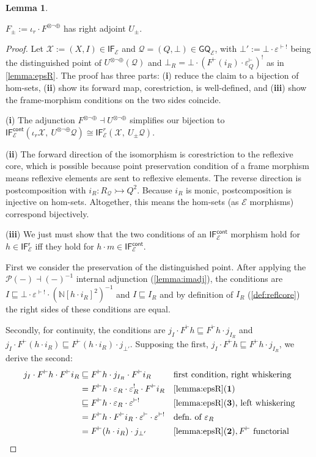 \documentclass{article}
\makeatletter
\newcommand{\allproofs}{} %
\newif\ifproofsinappendix
\newcommand{\lemmawithproof}[3]{%
  \begin{lemma}\label{#1}
    #2  
    \ifproofsinappendix \hyperref[xxx#1]{(Proof)} \fi
  \end{lemma}
    \ifproofsinappendix
  \g@addto@macro\allproofs{%
    \par\medskip
    \noindent
    \subsection*{\cref{#1}}\par
    #2\par
    \begin{proof}\label{xxx#1}
      #3
    \end{proof}%
  }
      \else

    \begin{proof}
      #3
    \end{proof}
    \fi 
}
\theoremstyle{definition}
\newtheorem{lemma}{Lemma}[section]
\newcommand{\N}{\mathbb{N}}
\newcommand{\cE}{\mathcal{E}}
\newcommand{\cP}{\mathcal{P}}
\newcommand{\cQ}{\mathcal{Q}}
\newcommand{\cX}{\mathcal{X}}
\newcommand{\cat}[1]{\mathsf{#1}}
\makeatother
\begin{document}
\lemmawithproof{lemma:reflrestrict}{
$F_\pm:=\iota_r\cdot F^{\otimes\neg\oplus}$ has right adjoint $U_\pm$.
}{
Let $\cX:=(X,I)\in \cat{IF_\cE}$ and $\cQ=(Q,\bot)\in \cat{GQ_\cE}$, with $\bot':=\bot\cdot \varepsilon^{\vdash!}$ being the distinguished point of $U^{\otimes\neg\oplus}(\cQ)$ and $\bot_R = \bot\cdot (F^\vdash(i_R)\cdot \varepsilon^\vdash_Q)^!$ as in \cref{lemma:epsR}. The proof has three parts: ({\bf i}) reduce the claim to a bijection of hom-sets, ({\bf ii}) show its forward map, corestriction, is well-defined, and ({\bf iii}) show the frame-morphism conditions on the two sides coincide.


({\bf i}) The adjunction $F^{\otimes\neg\oplus}\dashv U^{\otimes\neg\oplus}$ simplifies our bijection to $\cat{IF^{cont}_\cE}(\iota_r\cX,\ U^{\otimes\neg\oplus}\cQ)\cong\cat{IF}^r_\cE(\cX,\ U_\pm\cQ)$.

({\bf ii}) The forward direction of the isomorphism is corestriction to the reflexive core, which is possible because point preservation condition of a frame morphism means reflexive elements are sent to reflexive elements. 
The reverse direction is postcomposition with $i_R\colon R_\cQ\rightarrowtail Q^2$. Because $i_R$ is monic, postcomposition is injective on hom-sets. Altogether, this means the hom-sets (as $\cE$ morphisms) correspond bijectively.

({\bf iii}) We just must show that the two conditions of an $\cat{IF^{cont}_\cE}$ morphism hold for $h \in \cat{IF^r_\cE}$ iff they hold for $h\cdot m \in \cat{IF^{cont}_\cE}$.

First we consider the preservation of the distinguished point. After applying the $\cP(-)\dashv (-)^{-1}$ internal adjunction (\cref{lemma:imadj}), the conditions are
$I\sqsubseteq\bot\cdot\varepsilon^{\vdash!}\cdot(\N[h\cdot i_R]^2)^{-1}$ and
$I\sqsubseteq I_R$ and by definition of $I_R$ (\cref{def:reflcore}) the right sides of these conditions are equal.

Secondly, for continuity, the conditions are
$j_I\cdot F^\vdash h\sqsubseteq F^\vdash h\cdot j_{I_R}$ and
$j_I\cdot F^\vdash(h\cdot i_R)\sqsubseteq F^\vdash(h\cdot i_R)\cdot j_{\bot'}$.
Supposing the first, $j_I\cdot F^\vdash h\sqsubseteq F^\vdash h\cdot j_{I_R}$, we derive the second:
\begin{align*}
    j_I\cdot F^\vdash h\cdot F^\vdash i_R
    &\sqsubseteq F^\vdash h\cdot j_{I_R}\cdot F^\vdash i_R
        && \text{first condition, right whiskering}\\
    &= F^\vdash h\cdot\varepsilon_R\cdot\varepsilon_R^!\cdot F^\vdash i_R
        && \text{\cref{lemma:epsR}({\bf 1})}\\
    &\sqsubseteq F^\vdash h\cdot\varepsilon_R\cdot\varepsilon^{\vdash!}
        && \text{\cref{lemma:epsR}({\bf 3}), left whiskering}\\
    &= F^\vdash h\cdot F^\vdash i_R\cdot\varepsilon^{\vdash}\cdot\varepsilon^{\vdash!}
        && \text{defn.\ of }\varepsilon_R\\
    &= F^\vdash(h\cdot i_R)\cdot j_{\bot'}
        && \text{\cref{lemma:epsR}({\bf 2})}, F^\vdash\text{ functorial}
\end{align*}

}
\end{document}
